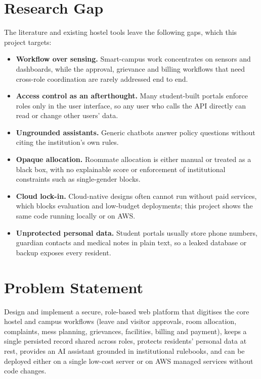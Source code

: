\documentclass[12pt,a4paper,oneside]{report}
\begin{document}
\section{Research Gap}
The literature and existing hostel tools leave the following gaps, which this project targets:
\begin{itemize}
  \item \textbf{Workflow over sensing.} Smart-campus work concentrates on sensors and dashboards, while the approval,
  grievance and billing workflows that need cross-role coordination are rarely addressed end to end.
  \item \textbf{Access control as an afterthought.} Many student-built portals enforce roles only in the user
  interface, so any user who calls the API directly can read or change other users' data.
  \item \textbf{Ungrounded assistants.} Generic chatbots answer policy questions without citing the institution's own
  rules.
  \item \textbf{Opaque allocation.} Roommate allocation is either manual or treated as a black box, with no explainable
  score or enforcement of institutional constraints such as single-gender blocks.
  \item \textbf{Cloud lock-in.} Cloud-native designs often cannot run without paid services, which blocks evaluation
  and low-budget deployments; this project shows the same code running locally or on AWS.
  \item \textbf{Unprotected personal data.} Student portals usually store phone numbers, guardian contacts and
  medical notes in plain text, so a leaked database or backup exposes every resident.
\end{itemize}

\section{Problem Statement}
Design and implement a secure, role-based web platform that digitises the core hostel and campus workflows (leave and
visitor approvals, room allocation, complaints, mess planning, grievances, facilities, billing and payment), keeps a single persisted record shared across roles, protects residents' personal data at rest, provides an AI
assistant grounded in institutional rulebooks, and can be
deployed either on a single low-cost server or on AWS managed services without code changes.
\end{document}
